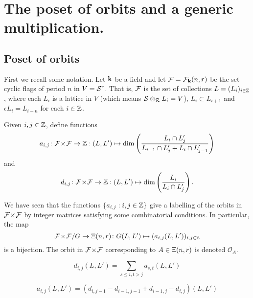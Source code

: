\documentclass[a4paper, 11pt]{report}
\begin{document}


\chapter{The poset of orbits and a generic multiplication.}

\section{Poset of orbits}

First we recall some notation. Let $\mathbf{k}$ be a field and let $\mathcal{F}=\mathcal{F}_{\mathbf{k}}(n,r)$ be the set cyclic flags of period $n$ in $V=\mathcal{S}^r$. That is, $\mathcal{F}$ is the set of collections $L = (L_i)_{i\in\mathbb{Z}}$, where each $L_i$ is a lattice in $V$ (which means $\mathcal{S}\otimes_{\mathcal{R}} L_i = V$), $L_i\subset L_{i+1}$ and $\epsilon L_i = L_{i-n}$ for each $i\in\mathbb{Z}$.

Given $i,j\in\mathbb{Z}$, define functions
\begin{equation*}
a_{i,j}\colon{\mathcal{F}\!\times\!\mathcal{F}}\to\mathbb{Z}: (L,L')\mapsto \dim\left(\frac{L_i\cap L_j'}{L_{i-1}\cap L_j' + L_i\cap L_{j-1}'}\right)
\end{equation*}
and
\begin{equation*}
d_{i,j}\colon{\mathcal{F}\!\times\!\mathcal{F}}\to\mathbb{Z}: (L,L')\mapsto \dim\left(\frac{L_i}{L_i\cap L_j'}\right).
\end{equation*}

We have seen that the functions $\{a_{i,j}:i,j\in\mathbb{Z}\}$ give a labelling of the orbits in ${\mathcal{F}\!\times\!\mathcal{F}}$ by integer matrices satisfying some combinatorial conditions. In particular, the map
\begin{equation*}
{\mathcal{F}\!\times\!\mathcal{F}}/G\to\Xi(n,r)\colon G(L,L') \mapsto (a_{i,j}(L,L'))_{i,j\in\mathbb{Z}}
\end{equation*}
is a bijection. The orbit in ${\mathcal{F}\!\times\!\mathcal{F}}$ corresponding to $A\in\Xi(n,r)$ is denoted $\mathcal{O}_A$.


\begin{equation*}
d_{i,j}(L,L') = \sum_{s\le i, t>j} a_{s,t}(L,L')
\end{equation*}

\begin{equation*}
a_{i,j}(L,L') = \left( d_{i,j-1} - d_{i-1,j-1} + d_{i-1,j} - d_{i,j}\right)(L,L')
\end{equation*}
\end{document}

